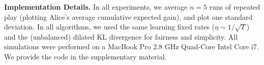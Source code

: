 \textbf{Implementation Details.} In all experiments, we average $n=5$ runs of repeated play (plotting Alice's average cumulative expected gain), and plot one standard deviation. In all algorithms, we used the same learning fixed rates ($\eta \sim1/\sqrt{T}$) and the (unbalanced) dilated KL divergence for fairness and simplicity. All simulations were performed on a MacBook Pro 2.8 GHz Quad-Core Intel Core i7. We provide the code in the supplementary material.

